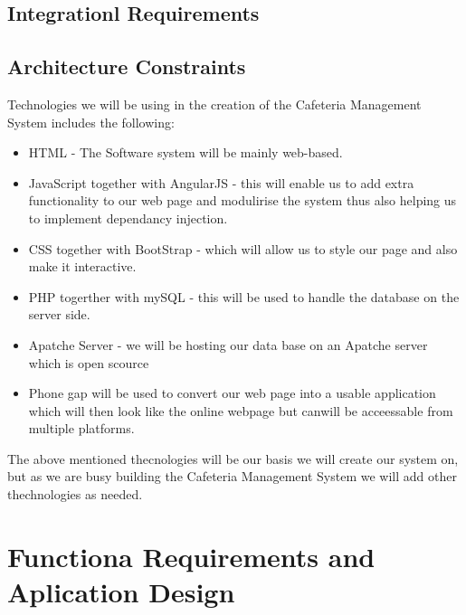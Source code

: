 \documentclass[12pt]{article}
\begin{document}
\subsection{Integrationl Requirements}

\subsection{Architecture Constraints}
Technologies we will be using in the creation of the Cafeteria Management System includes the following: 

\begin{itemize}
  \item HTML - The Software system will be mainly web-based.

  \item JavaScript together with AngularJS - this will enable us to add extra functionality to our web page and modulirise the 	 	system thus also helping us to implement dependancy injection.

 \item CSS together with BootStrap - which will allow us to style our page and also make it interactive.

 \item PHP togerther with mySQL - this will be used to handle the database on the server side.

 \item Apatche Server - we will be hosting our data base on an Apatche server which is open scource

 \item Phone gap will be used to convert our web page into a usable application which will then look like the online webpage but canwill be acceessable from multiple platforms.

\end{itemize}
The above mentioned thecnologies will be our basis we will create our system on, but as we are busy building the Cafeteria Management System we will add other thechnologies as needed. 


\section{Functiona Requirements and Aplication Design}
\end{document}
